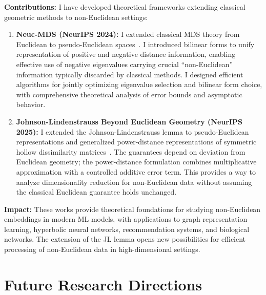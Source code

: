 \documentclass[11pt,letterpaper]{article}
\begin{document}
\textbf{Contributions:} I have developed theoretical frameworks extending classical geometric methods to non-Euclidean settings:

\begin{enumerate}
    \item \textbf{Neuc-MDS (NeurIPS 2024):} I extended classical MDS theory from Euclidean to pseudo-Euclidean spaces~\cite{neucMDS}. I introduced bilinear forms to unify representation of positive and negative distance information, enabling effective use of negative eigenvalues carrying crucial ``non-Euclidean'' information typically discarded by classical methods. I designed efficient algorithms for jointly optimizing eigenvalue selection and bilinear form choice, with comprehensive theoretical analysis of error bounds and asymptotic behavior.

    \item \textbf{Johnson-Lindenstrauss Beyond Euclidean Geometry (NeurIPS 2025):} I extended the Johnson-Lindenstrauss lemma to pseudo-Euclidean representations and generalized power-distance representations of symmetric hollow dissimilarity matrices~\cite{deng2026johnson}. The guarantees depend on deviation from Euclidean geometry; the power-distance formulation combines multiplicative approximation with a controlled additive error term. This provides a way to analyze dimensionality reduction for non-Euclidean data without assuming the classical Euclidean guarantee holds unchanged.
\end{enumerate}

\textbf{Impact:} These works provide theoretical foundations for studying non-Euclidean embeddings in modern ML models, with applications to graph representation learning, hyperbolic neural networks, recommendation systems, and biological networks. The extension of the JL lemma opens new possibilities for efficient processing of non-Euclidean data in high-dimensional settings.

\vspace{-0.1in}

















\section*{Future Research Directions}
\end{document}
